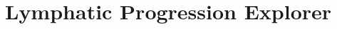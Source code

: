 \documentclass[\relativeRoot/main.tex]{subfiles}
\begin{document}
\chapter[LyProX -- Lymphatic Progression Explorer]{\hspace{0.3mm}\\[0.5ex]\large{Lymphatic Progression Explorer}}
\label{chap:lyprox}
\globalreset








% 

\end{document}
